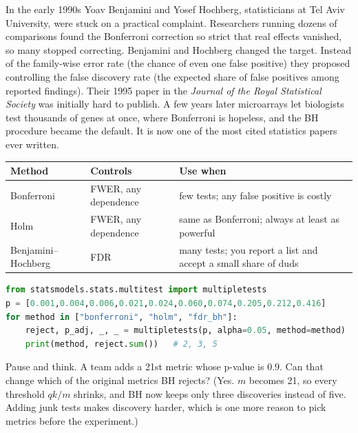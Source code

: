 \begin{historybox}
In the early 1990s Yoav Benjamini and Yosef Hochberg, statisticians at Tel Aviv
University, were stuck on a practical complaint. Researchers running dozens of
comparisons found the Bonferroni correction so strict that real effects vanished,
so many stopped correcting. Benjamini and Hochberg changed the target.
Instead of the family-wise error rate (the chance of even one false positive)
they proposed controlling the false discovery rate (the expected share of false
positives among reported findings). Their 1995 paper in the \emph{Journal of the
Royal Statistical Society} was initially hard to publish. A few years later
microarrays let biologists test thousands of genes at once, where Bonferroni is
hopeless, and the BH procedure became the default. It is now one of the most cited
statistics papers ever written.
\end{historybox}

\begin{center}
\renewcommand{\arraystretch}{1.25}
\begin{tabular}{p{2.6cm}p{3.3cm}p{6.2cm}}
\toprule
Method & Controls & Use when \\
\midrule
Bonferroni & FWER, any dependence & few tests; any false positive is costly \\
Holm & FWER, any dependence & same as Bonferroni; always at least as powerful \\
Benjamini--Hochberg & FDR & many tests; you report a list and accept a small share of duds \\
\bottomrule
\end{tabular}
\end{center}

\begin{lstlisting}[language=Python]
from statsmodels.stats.multitest import multipletests
p = [0.001,0.004,0.006,0.021,0.024,0.060,0.074,0.205,0.212,0.416]
for method in ["bonferroni", "holm", "fdr_bh"]:
    reject, p_adj, _, _ = multipletests(p, alpha=0.05, method=method)
    print(method, reject.sum())   # 2, 3, 5
\end{lstlisting}

\begin{recoverybox}
Pause and think. A team adds a 21st metric whose p-value is $0.9$. Can that
change which of the original metrics BH rejects? (Yes. $m$ becomes 21, so every
threshold $qk/m$ shrinks, and BH now keeps only three discoveries instead of five.
Adding junk tests makes discovery harder, which is one more reason to pick metrics
before the experiment.)
\end{recoverybox}

